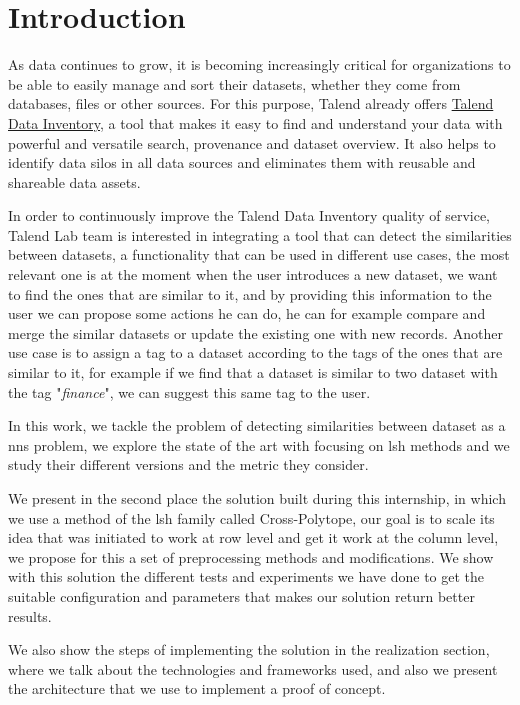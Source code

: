 \chapter*{Introduction}

As data continues to grow, it is becoming increasingly critical for
organizations to be able to easily manage and sort their datasets, whether they
come from databases, files or other sources. For this purpose, Talend already
offers \href{https://www.talend.com/products/data-inventory/}{Talend Data
Inventory}, a tool that makes it easy to find and understand your data with
powerful and versatile search, provenance and dataset overview. It also helps to
identify data silos in all data sources and eliminates them with reusable and
shareable data assets.

In order to continuously improve the Talend Data Inventory quality of service,  
Talend Lab team is interested in integrating a tool that can detect the
similarities between datasets, a functionality that can be used in different use
cases, the most relevant one is at the moment when the user introduces a new
dataset, we want to find the ones that are similar to it, and by providing this
information to the user we can propose some actions he can do, he can for
example compare and merge the similar datasets or update the existing one with
new records. Another use case is to assign a tag to a dataset according to the
tags of the ones that are similar to it, for example if we find that a dataset
is similar to two dataset with the tag "\textit{finance}", we can suggest this
same tag to the user.

In this work, we tackle the problem of detecting similarities between dataset as
a \Acrfull{nns} problem, we explore the state of the art with focusing on
\Acrfull{lsh} methods and we study their different versions and the metric they
consider.

We present in the second place the solution built during this internship, in
which we use a method of the \acrshort{lsh} family called Cross-Polytope, our
goal is to scale its idea that was initiated to work at row level and get it
work at the column level, we propose for this a set of preprocessing methods and
modifications. We show with this solution the different tests and experiments we
have done to get the suitable configuration and parameters that makes our
solution return better results.

We also show the steps of implementing the solution in the realization section,
where we talk about the technologies and frameworks used, and also we present
the architecture that we use to implement a proof of concept.

